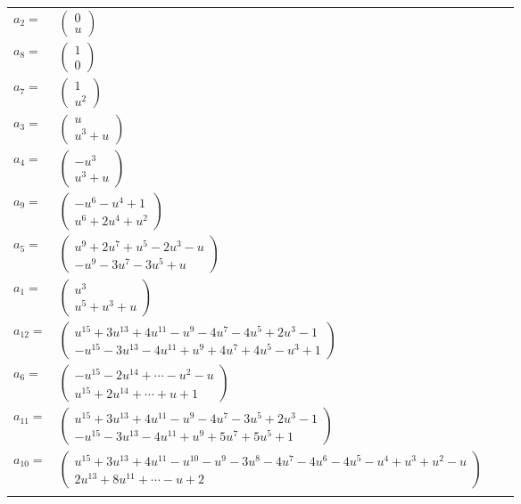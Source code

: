\documentclass[1p]{elsarticle_modified}
\theoremstyle{definition}
\begin{document}
\begin{tabular}{m{7pt} m{180pt} m{7pt} m{180pt} }
\flushright $a_{2}=$&$\begin{pmatrix}0\\u\end{pmatrix}$ \\
\flushright $a_{8}=$&$\begin{pmatrix}1\\0\end{pmatrix}$ \\
\flushright $a_{7}=$&$\begin{pmatrix}1\\u^2\end{pmatrix}$ \\
\flushright $a_{3}=$&$\begin{pmatrix}u\\u^3+u\end{pmatrix}$ \\
\flushright $a_{4}=$&$\begin{pmatrix}- u^3\\u^3+u\end{pmatrix}$ \\
\flushright $a_{9}=$&$\begin{pmatrix}- u^6- u^4+1\\u^6+2 u^4+u^2\end{pmatrix}$ \\
\flushright $a_{5}=$&$\begin{pmatrix}u^9+2 u^7+u^5-2 u^3- u\\- u^9-3 u^7-3 u^5+u\end{pmatrix}$ \\
\flushright $a_{1}=$&$\begin{pmatrix}u^3\\u^5+u^3+u\end{pmatrix}$ \\
\flushright $a_{12}=$&$\begin{pmatrix}u^{15}+3 u^{13}+4 u^{11}- u^9-4 u^7-4 u^5+2 u^3-1\\- u^{15}-3 u^{13}-4 u^{11}+u^9+4 u^7+4 u^5- u^3+1\end{pmatrix}$ \\
\flushright $a_{6}=$&$\begin{pmatrix}- u^{15}-2 u^{14}+\cdots- u^2- u\\u^{15}+2 u^{14}+\cdots+u+1\end{pmatrix}$ \\
\flushright $a_{11}=$&$\begin{pmatrix}u^{15}+3 u^{13}+4 u^{11}- u^9-4 u^7-3 u^5+2 u^3-1\\- u^{15}-3 u^{13}-4 u^{11}+u^9+5 u^7+5 u^5+1\end{pmatrix}$ \\
\flushright $a_{10}=$&$\begin{pmatrix}u^{15}+3 u^{13}+4 u^{11}- u^{10}- u^9-3 u^8-4 u^7-4 u^6-4 u^5- u^4+u^3+u^2- u\\2 u^{13}+8 u^{11}+\cdots- u+2\end{pmatrix}$\\&\end{tabular}
\end{document}
